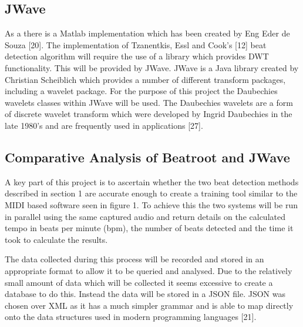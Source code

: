 \documentclass[a4paper, 11pt]{article}
\begin{document}
\subsection{JWave}
 As a there is a Matlab implementation which has been created by Eng Eder de Souza [20].
The implementation of Tzanentkis, Essl and Cook's [12] beat detection algorithm will require the use of a library which provides DWT functionality. This will be provided by JWave. JWave is a Java library created by Christian Scheiblich which provides a number of different transform packages, including a wavelet package. For the purpose of this project the Daubechies wavelets classes within JWave will be used. The Daubechies wavelets are a form of discrete wavelet transform which were developed by Ingrid Daubechies in the late 1980's and are frequently used in applications [27]. 

\subsection{Comparative Analysis of Beatroot and JWave}
A key part of this project is to ascertain whether the two beat detection methods described in section 1 are accurate enough to create a training tool similar to the MIDI based software seen in figure 1. To achieve this the two systems will be run in parallel using the same captured audio and return details on the calculated tempo in beats per minute (bpm), the number of beats detected and the time it took to calculate the results. 

The data collected during this process will be recorded and stored in an appropriate format to allow it to be queried and analysed. Due to the relatively small amount of data which will be collected it seems excessive to create a database to do this. Instead the data will be stored in a JSON file. JSON was chosen over XML as it has a much simpler grammar and is able to map directly onto the data structures used in modern programming languages [21].
\end{document}
